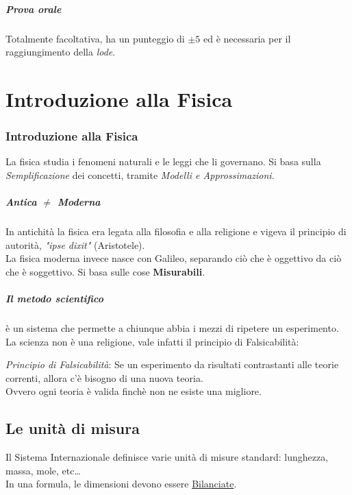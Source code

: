 \documentclass[12pt, a4paper, openany]{book}
\begin{document}
\paragraph*{Prova orale}
Totalmente facoltativa, ha un punteggio di $\pm 5$ ed è necessaria per il raggiungimento della \emph{lode}.

\chapter{Introduzione alla Fisica}

\subsection{Introduzione alla Fisica}
La fisica studia i fenomeni naturali e le leggi che li governano.
Si basa sulla \emph{Semplificazione} dei concetti, tramite \emph{Modelli e Approssimazioni}.

\paragraph{Antica $\neq$ Moderna} In antichità la fisica era legata alla filosofia e alla religione
e vigeva il principio di autorità, \emph{"ipse dixit"} (Aristotele).
\\La fisica moderna invece nasce con Galileo, separando ciò che è oggettivo da ciò che è soggettivo.
Si basa sulle cose \textbf{Misurabili}.
\paragraph{Il metodo scientifico} è un sistema che permette a chiunque abbia i mezzi di ripetere un esperimento.
La scienza non è una religione, vale infatti il principio di Falsicabilità:
\begin{center}
    \emph{Principio di Falsicabilità}: Se un esperimento da risultati contrastanti alle teorie correnti, allora c'è bisogno di una nuova teoria.
    \\Ovvero ogni teoria è valida finchè non ne esiste una migliore.
\end{center}
\section{Le unità di misura}
Il Sistema Internazionale definisce varie unità di misure standard: lunghezza, massa, mole, etc\dots
\\In una formula, le dimensioni devono essere \underline{Bilanciate}.
\end{document}
